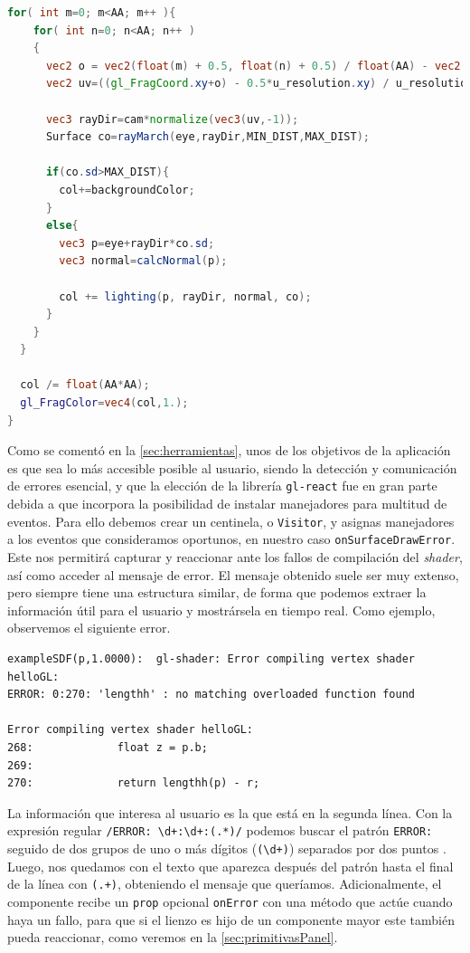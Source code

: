 \begin{lstlisting}[language=GLSL, caption=Procesador de fragmentos]
  for( int m=0; m<AA; m++ ){
    for( int n=0; n<AA; n++ )
    {
      vec2 o = vec2(float(m) + 0.5, float(n) + 0.5) / float(AA) - vec2(0.5);
      vec2 uv=((gl_FragCoord.xy+o) - 0.5*u_resolution.xy) / u_resolution.y;
  
      vec3 rayDir=cam*normalize(vec3(uv,-1));
      Surface co=rayMarch(eye,rayDir,MIN_DIST,MAX_DIST);
  
      if(co.sd>MAX_DIST){
        col+=backgroundColor;
      }
      else{
        vec3 p=eye+rayDir*co.sd;
        vec3 normal=calcNormal(p);
        
        col += lighting(p, rayDir, normal, co);
      }
    }
  }
  
  col /= float(AA*AA);
  gl_FragColor=vec4(col,1.);
}
\end{lstlisting}


Como se comentó en la \autoref{sec:herramientas}, unos de los objetivos de la aplicación es que sea lo más accesible posible al usuario, siendo la detección y comunicación de errores esencial, y que la elección de la librería \texttt{gl-react} fue en gran parte debida a que incorpora la posibilidad de instalar manejadores para multitud de eventos. Para ello debemos crear un centinela, o \texttt{Visitor}, y asignas manejadores a los eventos que consideramos oportunos, en nuestro caso \texttt{onSurfaceDrawError}. Este nos permitirá capturar y reaccionar ante los fallos de compilación del \textit{shader}, así como acceder al mensaje de error. El mensaje obtenido suele ser muy extenso, pero siempre tiene una estructura similar, de forma que podemos extraer la información útil para el usuario y mostrársela en tiempo real. Como ejemplo, observemos el siguiente error.
\begin{lstlisting}
exampleSDF(p,1.0000):  gl-shader: Error compiling vertex shader helloGL:
ERROR: 0:270: 'lengthh' : no matching overloaded function found

Error compiling vertex shader helloGL:
268:             float z = p.b;
269:       
270:             return lengthh(p) - r;
\end{lstlisting}
La información que interesa al usuario es la que está en la segunda línea. Con la expresión regular \texttt{/ERROR: \textbackslash d+:\textbackslash d+:(.*)/} podemos buscar el patrón \texttt{ERROR:} seguido de dos grupos de uno o más dígitos (\texttt{(\textbackslash d+)}) separados por dos puntos . Luego, nos quedamos con el texto que aparezca después del patrón hasta el final de la línea con \texttt{(.+)}, obteniendo el mensaje que queríamos. Adicionalmente, el componente recibe un \texttt{prop} opcional \texttt{onError} con una método que actúe cuando haya un fallo, para que si el lienzo es hijo de un componente mayor este también pueda reaccionar, como veremos en la \autoref{sec:primitivasPanel}.\newline

